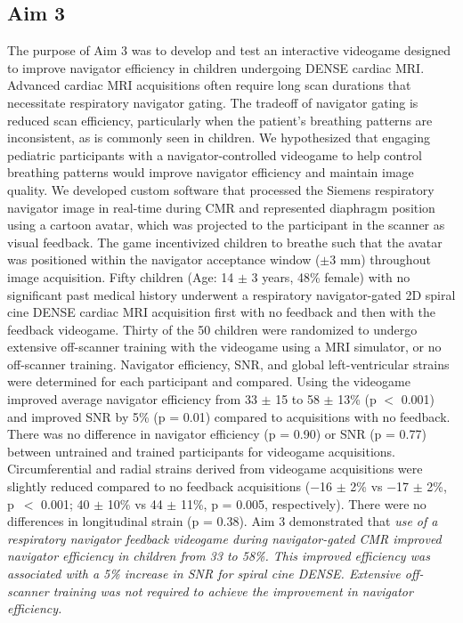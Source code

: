 \subsection{Aim 3}
	The purpose of Aim 3 was to develop and test an interactive videogame designed to improve navigator efficiency in children undergoing DENSE cardiac MRI. Advanced cardiac MRI acquisitions often require long scan durations that necessitate respiratory navigator gating. The tradeoff of navigator gating is reduced scan efficiency, particularly when the patient's breathing patterns are inconsistent, as is commonly seen in children. We hypothesized that engaging pediatric participants with a navigator-controlled videogame to help control breathing patterns would improve navigator efficiency and maintain image quality. We developed custom software that processed the Siemens respiratory navigator image in real-time during CMR and represented diaphragm position using a cartoon avatar, which was projected to the participant in the scanner as visual feedback. The game incentivized children to breathe such that the avatar was positioned within the navigator acceptance window ($\pm$3 mm) throughout image acquisition. Fifty children (Age: 14 $\pm$ 3 years, 48\% female) with no significant past medical history underwent a respiratory navigator-gated 2D spiral cine DENSE cardiac MRI acquisition first with no feedback and then with the feedback videogame. Thirty of the 50 children were randomized to undergo extensive off-scanner training with the videogame using a MRI simulator, or no off-scanner training. Navigator efficiency, SNR, and global left-ventricular strains were determined for each participant and compared. Using the videogame improved average navigator efficiency from 33 $\pm$ 15 to 58 $\pm$ 13\% (p $<$ 0.001) and improved SNR by 5\% (p = 0.01) compared to acquisitions with no feedback. There was no difference in navigator efficiency (p = 0.90) or SNR (p = 0.77) between untrained and trained participants for videogame acquisitions. Circumferential and radial strains derived from videogame acquisitions were slightly reduced compared to no feedback acquisitions (−16 $\pm$ 2\% vs −17 $\pm$ 2\%, p~$<$ 0.001; 40 $\pm$ 10\% vs 44 $\pm$ 11\%, p = 0.005, respectively). There were no differences in longitudinal strain (p = 0.38). Aim 3 demonstrated that \textit{use of a respiratory navigator feedback videogame during navigator-gated CMR improved navigator efficiency in children from 33 to 58\%. This improved efficiency was associated with a 5\% increase in SNR for spiral cine DENSE. Extensive off-scanner training was not required to achieve the improvement in navigator efficiency.}

